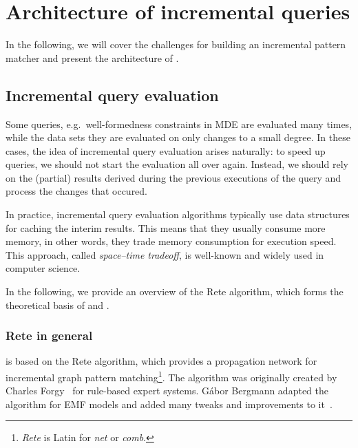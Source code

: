 \section{Architecture of incremental queries}
\label{sec:architecture}

In the following, we will cover the challenges for building an incremental pattern matcher and present the architecture of \iqd{}.



\subsection{Incremental query evaluation}
\label{rete}

Some queries, e.g.\ well-formedness constraints in MDE are evaluated many times, while the data sets they are evaluated on only changes to a small degree. In these cases, the idea of incremental query evaluation arises naturally: to speed up queries, we should not start the evaluation all over again. Instead, we should rely on the (partial) results derived during the previous executions of the query and process the changes that occured.
 
In practice, incremental query evaluation algorithms typically use data structures for caching the interim results. This  means that they usually consume more memory, in other words, they trade memory consumption for execution speed. This approach, called \emph{space--time tradeoff}, is well-known and widely used in computer science.

In the following, we provide an overview of the Rete algorithm, which forms the theoretical basis of \eiq{} and \iqd{}.

\subsubsection{Rete in general}

\iqd{} is based on the Rete algorithm, which provides a propagation network for incremental graph pattern matching\footnote{\emph{Rete} is Latin for \emph{net} or \emph{comb}.}. The algorithm was originally created by Charles Forgy~\cite{Forgy} for rule-based expert systems. Gábor Bergmann adapted the algorithm for EMF models and added many tweaks and improvements to it~\cite{BergmannRete}.


